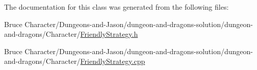 The documentation for this class was generated from the following files\+:\begin{DoxyCompactItemize}
\item 
Bruce Character/\+Dungeons-\/and-\/\+Jason/dungeon-\/and-\/dragons-\/solution/dungeon-\/and-\/dragons/\+Character/\hyperlink{_friendly_strategy_8h}{Friendly\+Strategy.\+h}\item 
Bruce Character/\+Dungeons-\/and-\/\+Jason/dungeon-\/and-\/dragons-\/solution/dungeon-\/and-\/dragons/\+Character/\hyperlink{_friendly_strategy_8cpp}{Friendly\+Strategy.\+cpp}\end{DoxyCompactItemize}

